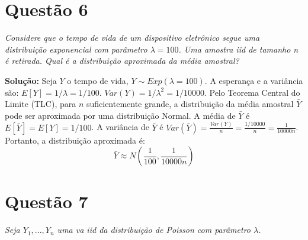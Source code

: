 \documentclass[12pt, a4paper]{article}
\begin{document}
\section*{Questão 6}
\textit{Considere que o tempo de vida de um dispositivo eletrônico segue uma distribuição exponencial com parâmetro $\lambda=100$. Uma amostra iid de tamanho n é retirada. Qual é a distribuição aproximada da média amostral?}

\textbf{Solução:}
Seja $Y$ o tempo de vida, $Y \sim Exp(\lambda=100)$. A esperança e a variância são:
$E[Y] = 1/\lambda = 1/100$.
$Var(Y) = 1/\lambda^2 = 1/10000$.
Pelo Teorema Central do Limite (TLC), para $n$ suficientemente grande, a distribuição da média amostral $\bar{Y}$ pode ser aproximada por uma distribuição Normal.
A média de $\bar{Y}$ é $E[\bar{Y}] = E[Y] = 1/100$.
A variância de $\bar{Y}$ é $Var(\bar{Y}) = \frac{Var(Y)}{n} = \frac{1/10000}{n} = \frac{1}{10000n}$.
Portanto, a distribuição aproximada é:
$$ \bar{Y} \approx N\left(\frac{1}{100}, \frac{1}{10000n}\right) $$

\section*{Questão 7}
\textit{Seja $Y_{1},...,Y_{n}$ uma va iid da distribuição de Poisson com parâmetro $\lambda$.}
\end{document}
